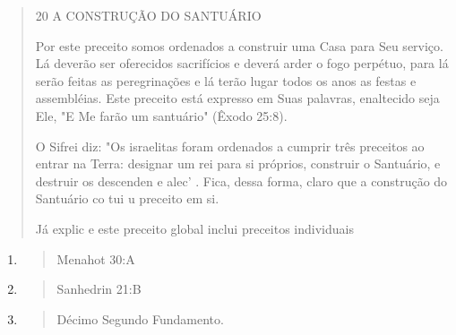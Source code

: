 \begin{quote}
20 A CONSTRUÇÃO DO SANTUÁRIO

Por este preceito somos ordenados a construir uma Casa para Seu serviço.
Lá deverão ser oferecidos sacrifícios e deverá arder o fogo perpétuo,
para lá serão feitas as peregrinações e lá terão lugar todos os anos as
festas e assembléias. Este preceito está expresso em Suas palavras,
enaltecido seja Ele, "E Me farão um santuário" (Êxodo 25:8).

O Sifrei diz: "Os israelitas foram ordenados a cumprir três preceitos ao
entrar na Terra: designar um rei para si próprios, construir o
Santuário, e destruir os descenden e alec' . Fica, dessa forma, claro
que a constru­ção do Santuário co tui u preceito em si.

Já explic e este preceito global inclui preceitos individuais
\end{quote}

\begin{enumerate}
\def\labelenumi{\arabic{enumi}.}
\setcounter{enumi}{43}
\item
  \begin{quote}
  Menahot 30:A
  \end{quote}
\item
  \begin{quote}
  Sanhedrin 21:B
  \end{quote}
\item
  \begin{quote}
  Décimo Segundo Fundamento.
  \end{quote}
\end{enumerate}

